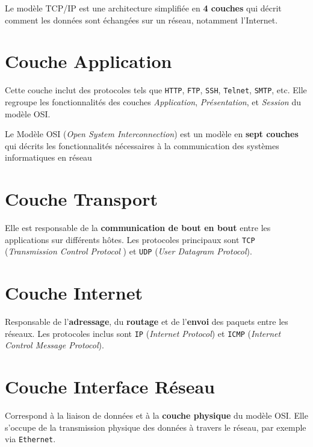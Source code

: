 \documentclass[a4paper]{report}
\begin{document}
    \begin{Définition}
        Le modèle TCP/IP est une architecture simplifiée 
        en \textbf{4 couches}  qui décrit 
        comment les données sont échangées sur un réseau, 
        notamment l'Internet. 
    \end{Définition}        

    \section{Couche Application}
    Cette couche inclut des protocoles tels que \texttt{HTTP}, 
    \texttt{FTP}, \texttt{SSH}, \texttt{Telnet}, \texttt{SMTP}, etc. 
    Elle regroupe les fonctionnalités des couches \textit{Application}, 
    \textit{Présentation}, et \textit{Session} du modèle OSI.

    \begin{note}{}{}
        Le Modèle OSI (\textit{Open System Interconnection}) est un modèle 
        en \textbf{sept couches} qui décrits les fonctionnalités nécessaires 
        à la communication des systèmes informatiques en réseau
    \end{note}

    \section{Couche Transport}
    Elle est responsable de la \textbf{communication de bout en bout} entre 
    les applications sur différents hôtes. 
    Les protocoles principaux sont \texttt{TCP}   
    (\textit{Transmission Control Protocol}  ) 
    et \texttt{UDP}  (\textit{User Datagram Protocol}).

    \section{Couche Internet}
    Responsable de l'\textbf{adressage}, du \textbf{routage}  
    et de l'\textbf{envoi}  des paquets entre les réseaux. 
    Les protocoles inclus sont \texttt{IP}   (\textit{Internet Protocol}) 
    et \texttt{ICMP} (\textit{Internet Control Message Protocol}).

    \section{Couche Interface Réseau}
    Correspond à la liaison de données et à la 
    \textbf{couche physique} du modèle OSI. 
    Elle s'occupe de la transmission physique des données 
    à travers le réseau, par exemple via \texttt{Ethernet}.
\end{document}
